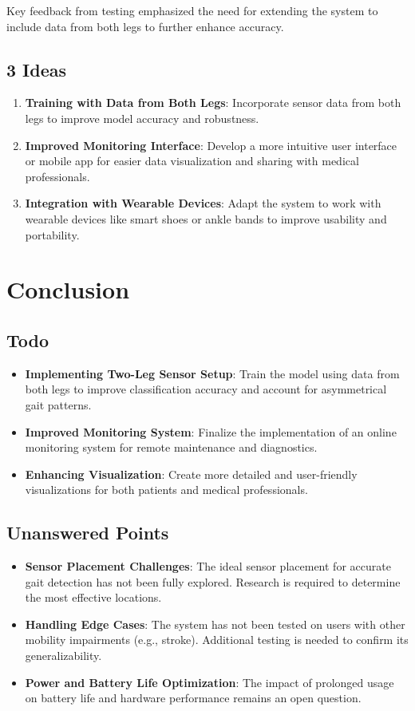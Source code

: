 Key feedback from testing emphasized the need for extending the system to include data from both legs to further enhance accuracy.

\subsection{3 Ideas}
\begin{enumerate}
	\item \textbf{Training with Data from Both Legs}: Incorporate sensor data from both legs to improve model accuracy and robustness.
	\item \textbf{Improved Monitoring Interface}: Develop a more intuitive user interface or mobile app for easier data visualization and sharing with medical professionals.
	\item \textbf{Integration with Wearable Devices}: Adapt the system to work with wearable devices like smart shoes or ankle bands to improve usability and portability.
\end{enumerate}

\section{Conclusion}

\subsection{Todo}
\begin{itemize}
	\item \textbf{Implementing Two-Leg Sensor Setup}: Train the model using data from both legs to improve classification accuracy and account for asymmetrical gait patterns.
	\item \textbf{Improved Monitoring System}: Finalize the implementation of an online monitoring system for remote maintenance and diagnostics.
	\item \textbf{Enhancing Visualization}: Create more detailed and user-friendly visualizations for both patients and medical professionals.
\end{itemize}

\subsection{Unanswered Points}
\begin{itemize}
	\item \textbf{Sensor Placement Challenges}: The ideal sensor placement for accurate gait detection has not been fully explored. Research is required to determine the most effective locations.
	\item \textbf{Handling Edge Cases}: The system has not been tested on users with other mobility impairments (e.g., stroke). Additional testing is needed to confirm its generalizability.
	\item \textbf{Power and Battery Life Optimization}: The impact of prolonged usage on battery life and hardware performance remains an open question.
\end{itemize}

